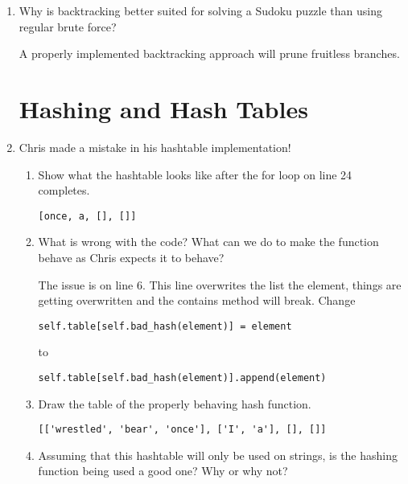 \documentclass[11pt]{article}
\newenvironment{answer}{\large\lstset{basicstyle=\large}\color{white}}{}
\newenvironment{answer}{\large\lstset{basicstyle=\large}\color{red}}{}
\begin{document}
\begin{enumerate}
\item Why is backtracking better suited for solving a Sudoku puzzle than
      using regular brute force?

    \begin{answer}
    A properly implemented backtracking approach will prune fruitless branches. 
    \end{answer}

\pagebreak
\section*{Hashing and Hash Tables}

\item Chris made a mistake in his hashtable implementation!

    
    \begin{enumerate}
    \item Show what the hashtable looks like after the for loop on line 24
          completes. 

        \begin{answer}
		\begin{lstlisting}[numbers=none]
[once, a, [], []]
		\end{lstlisting}

        \end{answer}

    \item What is wrong with the code? What can we do to make the function behave as Chris expects it to behave?

        \begin{answer}
        The issue is on line 6. This line overwrites the list the element, things are getting overwritten and the contains method will break. Change 
\begin{lstlisting}[numbers=none]
self.table[self.bad_hash(element)] = element 
\end{lstlisting} to 
\begin{lstlisting}[numbers=none]
self.table[self.bad_hash(element)].append(element)
\end{lstlisting}

        \end{answer}

    \item Draw the table of the properly behaving hash function.
        
        \begin{answer}
		\begin{lstlisting}[numbers=none]
[['wrestled', 'bear', 'once'], ['I', 'a'], [], []]
		\end{lstlisting}
    \end{answer}
\item Assuming that this hashtable will only be used on strings, is the hashing function being used a good one? Why or why not?


\end{enumerate}
\end{enumerate}
\end{document}
